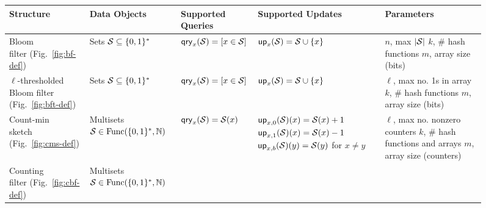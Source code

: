 \begin{figure*}[tp]
\begin{center}
\small
  \begin{tabular}{ |p{1.75cm} | p{2.5cm} | p{2.95cm} | p{4cm} | p{3.7cm}|}
    \hline
    {\bf Structure} & {\bf Data Objects} & {\bf Supported Queries} & {\bf Supported Updates} & {\bf Parameters} \\ \hline
    \parbox[c]{1.5cm}{Bloom\\ filter (Fig.~\ref{fig:bf-def})}
          & \parbox[c][6ex]{2cm}{Sets\\$\mathcal{S}\subseteq \{0,1\}^*$} %
          & $\mathsf{qry}_x(\mathcal{S}) = [x \in \mathcal{S}]$
          &  $\mathsf{up}_x(\mathcal{S}) = \mathcal{S} \cup \{x\}$
          & \parbox[c]{4cm}{$n$, max $|\mathcal{S}|$\\$k$, \# hash functions\\$m$, array size (bits)}
          \\\hline
     \parbox[c]{2cm}{$\ell$-thresholded\\ Bloom filter\\ (Fig.~\ref{fig:bft-def})}
          & \parbox[c]{2.5cm}{Sets\\ $\mathcal{S} \subseteq \{0,1\}^*$}
          & $\mathsf{qry}_x(\mathcal{S}) = [x \in \mathcal{S}]$
          & \parbox[c][10ex]{4cm}{$\mathsf{up}_x(\mathcal{S}) = \mathcal{S} \cup \{x\}$}
          & \parbox[c]{3.75cm}{$\ell$, max no. 1s in array\\$k$, \# hash functions\\$m$, array size (bits)}
          \\ \hline
     \parbox[c]{2cm}{Count-min\\ sketch (Fig.~\ref{fig:cms-def})}
          & \parbox[c]{2.5cm}{Multisets\\ $\mathcal{S} \in \mathrm{Func}(\{0,1\}^*,\mathbb{N})$}
          & $\mathsf{qry}_x(\mathcal{S}) = \mathcal{S}(x)$
          & \parbox[c][10ex]{4cm}{$\mathsf{up}_{x,0}(\mathcal{S})(x) = \mathcal{S}(x)+1$ \\ $\mathsf{up}_{x,1}(\mathcal{S})(x) = \mathcal{S}(x)-1$ \\ $\mathsf{up}_{x,b}(\mathcal{S})(y) = \mathcal{S}(y)$ for $x \neq y$}
          & \parbox[c]{3.75cm}{$\ell$, max no. nonzero counters\\$k$, \# hash functions and arrays\\$m$, array size (counters)}
          \\ \hline
    \parbox[c]{1.5cm}{Counting\\ filter (Fig.~\ref{fig:cbf-def})}
          & \parbox[c]{2.5cm}{Multisets\\ $\mathcal{S} \in \mathrm{Func}(\{0,1\}^*,\mathbb{N})$}

\end{tabular}
\end{center}
\end{figure*}
